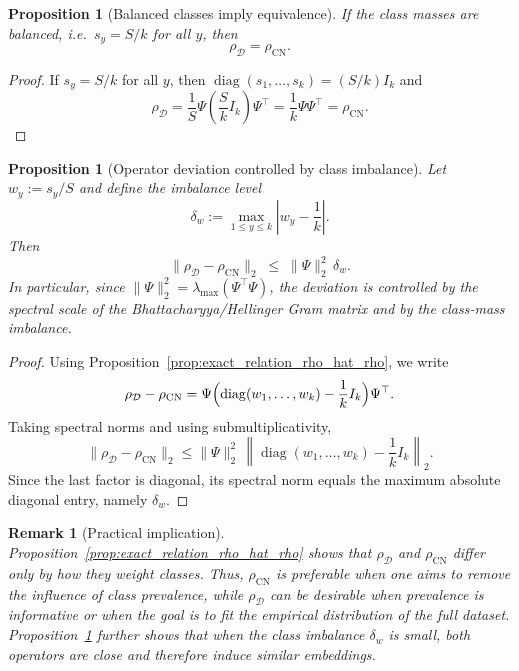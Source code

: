 \documentclass[preprint,11pt]{elsarticle}
\newtheorem{Proposition}[Theorem]{Proposition}
\newtheorem{Remark}[Theorem]{Remark}
\newcommand{\diag}{\operatorname{diag}}
\begin{document}
\begin{Proposition}[Balanced classes imply equivalence]
\label{prop:balanced_equivalence}
If the class masses are balanced, i.e.\ $s_y = S/k$ for all $y$, then
\[
\rho_{\mathcal D} = \rho_{\mathrm{CN}}.
\]
\end{Proposition}

\begin{proof}
If $s_y=S/k$ for all $y$, then $\diag(s_1,\dots,s_k)=(S/k)I_k$ and
\[
\rho_{\mathcal D}=\frac{1}{S}\Psi\left(\frac{S}{k}I_k\right)\Psi^\top=\frac{1}{k}\Psi\Psi^\top=\rho_{\mathrm{CN}}.
\]
\end{proof}

\begin{Proposition}[Operator deviation controlled by class imbalance]
\label{prop:operator_deviation_bound}
Let $w_y:=s_y/S$ and define the imbalance level
\[
\delta_w := \max_{1\le y\le k}\left|w_y-\frac{1}{k}\right|.
\]
Then
\[
\|\rho_{\mathcal D}-\rho_{\mathrm{CN}}\|_2
\;\le\;
\|\Psi\|_2^2\,\delta_w.
\]
In particular, since $\|\Psi\|_2^2=\lambda_{\max}(\Psi^\top\Psi)$, the deviation is controlled by the spectral scale of the
Bhattacharyya/Hellinger Gram matrix and by the class-mass imbalance.
\end{Proposition}

\begin{proof}
Using Proposition~\ref{prop:exact_relation_rho_hat_rho}, we write
\[
\rho_{\mathcal D}-\rho_{\mathrm{CN}}
=
\Psi\Bigl(\diag(w_1,\dots,w_k)-\frac{1}{k}I_k\Bigr)\Psi^\top.
\]
Taking spectral norms and using submultiplicativity,
\[
\|\rho_{\mathcal D}-\rho_{\mathrm{CN}}\|_2
\le
\|\Psi\|_2^2\,
\left\|\diag(w_1,\dots,w_k)-\frac{1}{k}I_k\right\|_2.
\]
Since the last factor is diagonal, its spectral norm equals the maximum absolute diagonal entry, namely $\delta_w$.
\end{proof}

\begin{Remark}[Practical implication]
Proposition~\ref{prop:exact_relation_rho_hat_rho} shows that $\rho_{\mathcal D}$ and $\rho_{\mathrm{CN}}$ differ only by how they weight classes.
Thus, $\rho_{\mathrm{CN}}$ is preferable when one aims to remove the influence of class prevalence, while $\rho_{\mathcal D}$
can be desirable when prevalence is informative or when the goal is to fit the empirical distribution of the full dataset.
Proposition~\ref{prop:operator_deviation_bound} further shows that when the class imbalance $\delta_w$ is small,
both operators are close and therefore induce similar embeddings.
\end{Remark}
\end{document}
